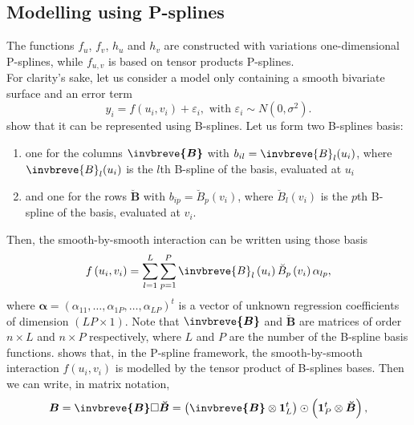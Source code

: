 \subsection{Modelling using P-splines}
The functions $f_u$, $f_v$, $h_u$ and $h_v$ are constructed  with variations one-dimensional P-splines, while $f_{u,v}$ is based on tensor products P-splines.\\
For clarity's sake, let us consider a model only containing a smooth bivariate surface and an error term
\begin{equation}
    y _ { i } = f \left( u _ { i } , v _ { i } \right) + \varepsilon _ { i } , \text { with } \varepsilon _ { i } \sim N \left( 0 , \sigma ^ { 2 } \right) \text{.}
\label{eq:smooth_part_only_model}
\end{equation}
\textcite{lee_efficient_2013} show that it can be represented using B-splines. Let us form two B-splines basis:
\begin{enumerate}
\item one for the columns $\boldsymbol{\invbreve{B}}$ with $ b_{il}= \invbreve{B}_l(u_i)$, where $\invbreve{B}_l(u_i)$ is the $l$th B-spline of the basis, evaluated at $u_i$
\item and one for the rows $\boldsymbol{\breve{B}}$ with $ b_{ip}= \breve{B}_p(v_i)$, where $\breve{B}_l(v_i)$ is the $p$th B-spline of the basis, evaluated at $v_i$.
\end{enumerate}
Then, the smooth-by-smooth interaction can be written using those basis
\begin{equation}
f \left( u _ { i } , v _ { i } \right) = \sum _ { l = 1 } ^ { L } \sum _ { p = 1 } ^ { P } \invbreve { B } _ { l } \left( u _ { i } \right) \breve { B } _ { p } \left( v _ { i } \right) \alpha _ { l p }  \text{,}
\end{equation}
where $\boldsymbol{\alpha} = (\alpha_{11},\ldots,\alpha_{1P},\ldots,\alpha_{LP})^t$ is a vector of unknown regression coefficients of dimension $(LP \times 1)$. Note that $\boldsymbol{\invbreve{B}}$ and $\boldsymbol{\breve{B}}$ are matrices of order $n \times L$ and $n\times P$ respectively, where $L$ and $P$ are the number of the B-spline basis functions. \textcite{dierckx_curve_1995} shows that, in the P-spline framework, the smooth-by-smooth interaction $f(u_i,v_i)$ is modelled by the tensor product of B-splines bases. Then we can write, in matrix notation,
\begin{equation}
    \boldsymbol{B} = \boldsymbol{\invbreve{B}} \square \boldsymbol{\breve{B}} = \left( \boldsymbol{\invbreve{ B }} \otimes \boldsymbol{1} _ { L } ^ { t } \right) \odot \left( \mathbf { 1 } _ { P } ^ { t } \otimes \boldsymbol{\breve{B}} \right) \text{,}
\end{equation}
